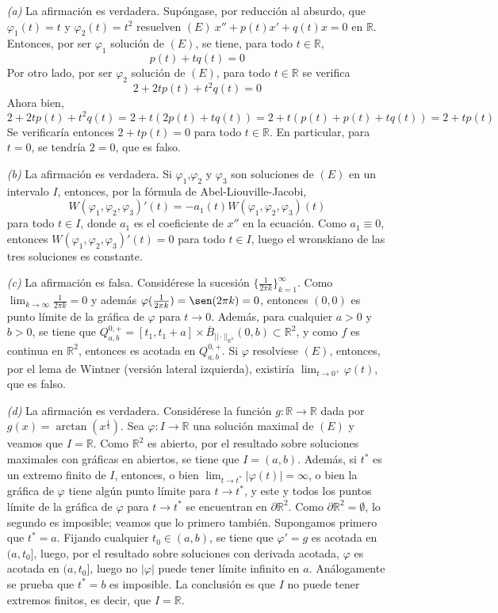 \documentclass[11pt]{report}
\newcommand{\R}{\mathbb R}
\begin{document}
\begin{itemize}
    \item[\textit{(a)}] La afirmación es verdadera. Supóngase, por reducción al absurdo, que $\varphi_1(t)=t$ y $\varphi_2(t)=t^2$ resuelven $(E) \ x''+p(t)x'+q(t)x=0$ en $\R$. Entonces, por ser $\varphi_1$ solución de $(E)$, se tiene, para todo $t \in \R$,
    \[p(t)+tq(t)=0\]
    Por otro lado, por ser $\varphi_2$ solución de $(E)$, para todo $t \in \R$ se verifica
    \[2+2tp(t)+t^2q(t)=0\]
    Ahora bien,
    \[2+2tp(t)+t^2q(t)=2+t(2p(t)+tq(t))=2+t(p(t)+p(t)+tq(t))=2+tp(t)\]
    Se verificaría entonces $2+tp(t)=0$ para todo $t \in \R$. En particular, para $t=0$, se tendría $2=0$, que es falso.
    \item[\textit{(b)}] La afirmación es verdadera. Si $\varphi_1$,$\varphi_2$ y $\varphi_3$ son soluciones de $(E)$ en un intervalo $I$, entonces, por la fórmula de Abel-Liouville-Jacobi,
    \[W(\varphi_1,\varphi_2,\varphi_3)'(t)=-a_1(t)W(\varphi_1,\varphi_2,\varphi_3)(t)\]
    para todo $t \in I$, donde $a_1$ es el coeficiente de $x''$ en la ecuación. Como $a_1\equiv 0$, entonces $W(\varphi_1,\varphi_2,\varphi_3)'(t)=0$ para todo $t \in I$, luego el wronskiano de las tres soluciones es constante. 
    \item[\textit{(c)}] La afirmación es falsa. Considérese la sucesión $\{\frac{1}{2\pi k}\}_{k=1}^\infty$. Como $\lim_{k \to \infty}\frac{1}{2\pi k}=0$ y además $\varphi(\frac{1}{2\pi k})=\sen(2\pi k)=0$, entonces $(0,0)$ es punto límite de la gráfica de $\varphi$ para $t \to 0$. Además, para cualquier $a>0$ y $b>0$, se tiene que $Q_{a,b}^{0,+}=[t_1,t_1+a] \times \overline{B}_{||\cdot ||_{\R^n}}(0,b) \subset \R^2$, y como $f$ es continua en $\R^2$, entonces es acotada en $Q_{a,b}^{0,+}$. Si $\varphi$ resolviese $(E)$, entonces, por el lema de Wintner (versión lateral izquierda), existiría $\lim_{t \to 0^+}\varphi(t)$, que es falso.
    \item[\textit{(d)}] La afirmación es verdadera. Considérese la función $g \colon \R \to \R$ dada por $g(x)=\arctan(x^{\frac{1}{3}})$. Sea $\varphi \colon I \to \R$ una solución maximal de $(E)$ y veamos que $I=\R$. Como $\R^2$ es abierto, por el resultado sobre soluciones maximales con gráficas en abiertos, se tiene que $I=(a,b)$. Además, si $t^*$ es un extremo finito de $I$, entonces, o bien $\lim_{t \to t^*} |\varphi(t)| = \infty$, o bien la gráfica de $\varphi$ tiene algún punto límite para $t \to t^*$, y este y todos los puntos límite de la gráfica de $\varphi$ para $t \to t^*$ se encuentran en $\partial \R^2$. Como $\partial \R^2= \emptyset$, lo segundo es imposible; veamos que lo primero también. Supongamos primero que $t^*=a$. Fijando cualquier $t_0 \in (a,b)$, se tiene que $\varphi'=g$ es acotada en $(a,t_0]$, luego, por el resultado sobre soluciones con derivada acotada, $\varphi$ es acotada en $(a,t_0]$, luego no $|\varphi|$ puede tener límite infinito en $a$. Análogamente se prueba que $t^*=b$ es imposible. La conclusión es que $I$ no puede tener extremos finitos, es decir, que $I=\R$.

\end{itemize}
\end{document}
